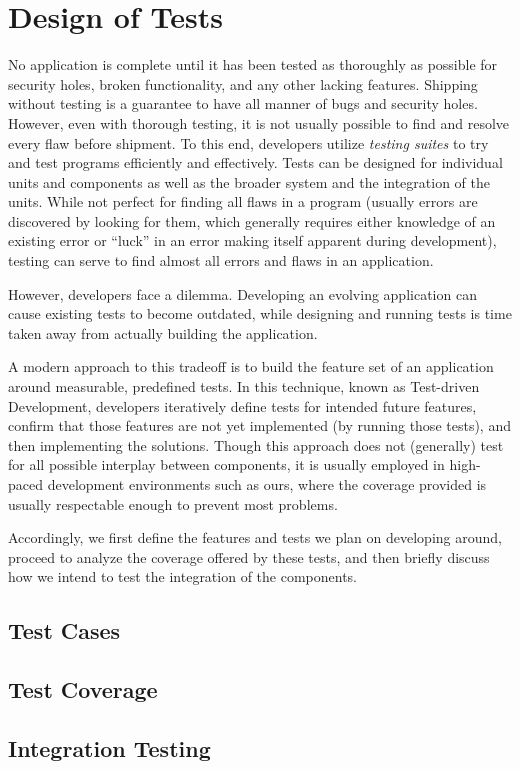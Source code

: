 \chapter{Design of Tests}

No application is complete until it has been tested
as thoroughly as possible for security holes, broken
functionality, and any other lacking features.
Shipping without testing is a guarantee to have
all manner of bugs and security holes. However, even
with thorough testing, it is not usually possible to
find and resolve every flaw before shipment. To this end,
developers utilize \emph{testing suites} to try and
test programs efficiently and effectively. Tests can be
designed for individual units and components as well as
the broader system and the integration of the units.
While not perfect for finding all flaws in a program
(usually errors are discovered by looking
for them, which generally requires either knowledge of an
existing error or ``luck'' in an error making itself
apparent during development), testing can serve to find
almost all errors and flaws in an application.

However, developers face a dilemma. Developing an
evolving application can cause existing tests to
become outdated, while designing and running tests
is time taken away from actually building the application.

A modern approach to this tradeoff is to build the
feature set of an application around measurable,
predefined tests. \cite{wiki:tdd} In this technique,
known as Test-driven Development, developers iteratively
define tests for intended future features, confirm that those
features are not yet implemented (by running those tests),
and then implementing the solutions. Though this approach
does not (generally) test for all possible interplay
between components, it is usually employed in high-paced
development environments such as ours, where the coverage provided is
usually respectable enough to prevent most problems.

Accordingly, we first define the features and tests we
plan on developing around, proceed to analyze the coverage
offered by these tests, and then briefly discuss how we
intend to test the integration of the components.

\section{Test Cases}



\section{Test Coverage}

\section{Integration Testing}